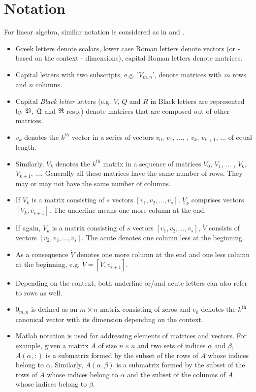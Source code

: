 \documentclass{scrartcl}
\begin{document}
\section{Notation}
For linear algebra, similar notation is considered as in \cite{Hoemmen:2010:CKS:1970638} and \cite{Grigori}.
\begin{itemize}
\item Greek letters denote scalars, lower case Roman letters denote vectors (or - based on the context - dimensions), capital Roman letters denote matrices.
\item Capital letters with two subscripts, e.g. '$V_{m, n}$', denote matrices with $m$ rows and $n$ columns.
\item Capital \textit{Black letter} letters (e.g. $V$, $Q$ and $R$ in Black letters are represented by $\frak{V}$, $\frak{Q}$ and $\frak{R}$ resp.) denote matrices that are composed out of other matrices. 
\item $v_k$ denotes the $k^{th}$ vector in a series of vectors $v_0$, $v_1$, $\ldots$, ,  $v_k$, $v_{k+1}$, $\ldots$ of equal length.
\item Similarly, $V_k$ denotes the $k^{th}$ matrix in a sequence of matrices $V_0$, $V_1$, $\ldots$ , $V_k$, $V_{k+1}$, $\ldots$. Generally all these matrices have the same number of rows. They may or may not have the same number of columns.
\item If $V_k$ is a matrix consisting of $s$ vectors $\left[v_1, v_2, \ldots, v_s\right]$, $\underline{V}_k$ comprises vectors $\left[V_k, v_{s+1} \right]$. The underline means one more column at the end.
\item If again, $V_k$ is a matrix consisting of $s$ vectors $\left[v_1, v_2, \ldots, v_s\right]$, $\acute{V}$ consists of vectors $[v_2, v_3, \ldots, v_s]$. The acute denotes one column less at the beginning.
\item As a consequence $\underline{\acute{V}}$ denotes one more column at the end and one less column at the beginning, e.g. $\underline{\acute{V}} = [\acute{V}, v_{s+1}]$.
\item Depending on the context, both underline or/and acute letters can also refer to rows as well. 
\item $0_{m, n}$ is defined as an $m \times n$ matrix consisting of zeros and $e_k$ denotes the $k^{\text{th}}$ canonical vector with its dimension depending on the context.
\item Matlab notation is used for addressing elements of matrices and vectors. For example, given a matrix $A$ of size $n \times n$ and two sets of indices $\alpha$ and $\beta$, $A(\alpha,:)$ is a submatrix formed by the subset of the rows of $A$ whose indices belong to $\alpha$. Similarly, $A(\alpha, \beta)$ is a submatrix formed by the subset of the rows of $A$ whose indices belong to $\alpha$ and the subset of the columns of $A$ whose indices belong to $\beta$.

\end{itemize}
\end{document}
